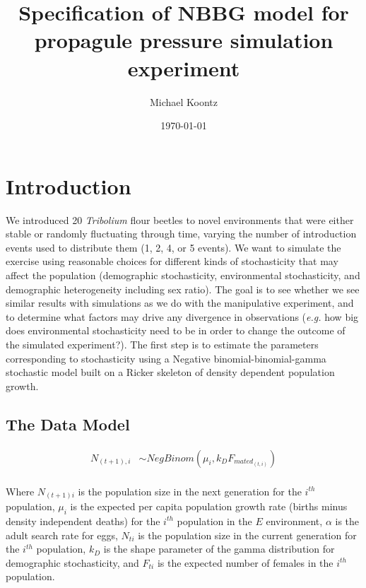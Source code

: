 \documentclass{article}[12pt]
\begin{document}
\title{Specification of NBBG model for propagule pressure simulation experiment}
\author{Michael Koontz} 
\date{\today}

\maketitle
\pagestyle {plain}

\vspace{-4em}

\section*{Introduction}

We introduced 20 \emph{Tribolium} flour beetles to novel environments that were either stable or randomly fluctuating through time, varying the number of introduction events used to distribute them (1, 2, 4, or 5 events). We want to simulate the exercise using reasonable choices for different kinds of stochasticity that may affect the population (demographic stochasticity, environmental stochasticity, and demographic heterogeneity including sex ratio). The goal is to see whether we see similar results with simulations as we do with the manipulative experiment, and to determine what factors may drive any divergence in observations (\emph{e.g.} how big does environmental stochasticity need to be in order to change the outcome of the simulated experiment?). The first step is to estimate the parameters corresponding to stochasticity using a Negative binomial-binomial-gamma stochastic model built on a Ricker skeleton of density dependent population growth.

\subsection*{The Data Model}

\begin{align*}
N_{(t+1), i} & \sim NegBinom(\mu_i, k_DF_{{mated}_{(t,i)}}) \\
\end{align*}

Where $N_{(t+1)i}$ is the population size in the next generation for the $i^{th}$ population, $\mu_i$ is the expected per capita population growth rate (births minus density independent deaths) for the $i^{th}$ population in the $E$ environment, $\alpha$ is the adult search rate for eggs, $N_{ti}$ is the population size in the current generation for the $i^{th}$ population, $k_D$ is the shape parameter of the gamma distribution for demographic stochasticity, and $F_{ti}$ is the expected number of females in the $i^{th}$ population.
\end{document}
